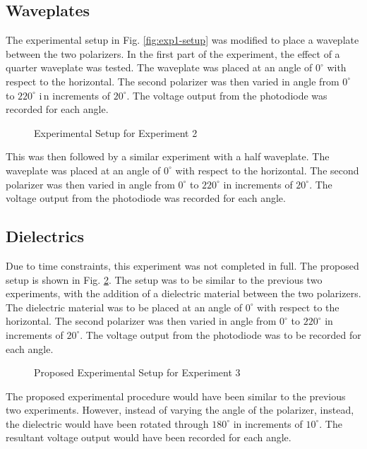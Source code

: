\documentclass[aip, cp, amsmath, amssymb, reprint]{revtex4-2}
\begin{document}
        \subsection{Waveplates}
            The experimental setup in Fig. \ref{fig:exp1-setup} was modified to place a waveplate between the two polarizers. In the first part of the experiment, the effect of a quarter waveplate was tested. The waveplate was placed at an angle of $0^\circ$ with respect to the horizontal. The second polarizer was then varied in angle from $0^\circ$ to $220^\circ$ i\,n increments of $20^\circ$. The voltage output from the photodiode was recorded for each angle.

            \begin{figure}[H]
                \centering
                
                \caption{Experimental Setup for Experiment 2}
                \label{fig:exp2-setup}
            \end{figure}

            This was then followed by a similar experiment with a half waveplate. The waveplate was placed at an angle of $0^\circ$ with respect to the horizontal. The second polarizer was then varied in angle from $0^\circ$ to $220^\circ$ in increments of $20^\circ$. The voltage output from the photodiode was recorded for each angle.

        \subsection{Dielectrics}
            Due to time constraints, this experiment was not completed in full. The proposed setup is shown in Fig. \ref{fig:exp3-setup}. The setup was to be similar to the previous two experiments, with the addition of a dielectric material between the two polarizers. The dielectric material was to be placed at an angle of $0^\circ$ with respect to the horizontal. The second polarizer was then varied in angle from $0^\circ$ to $220^\circ$ in increments of $20^\circ$. The voltage output from the photodiode was to be recorded for each angle.

            \begin{figure}[H]
                \centering
                
                \caption{Proposed Experimental Setup for Experiment 3}
                \label{fig:exp3-setup}
            \end{figure}

            The proposed experimental procedure would have been similar to the previous two experiments. However, instead of varying the angle of the polarizer, instead, the dielectric would have been rotated through $180^\circ$ in increments of $10^\circ$. The resultant voltage output would have been recorded for each angle.
\end{document}
